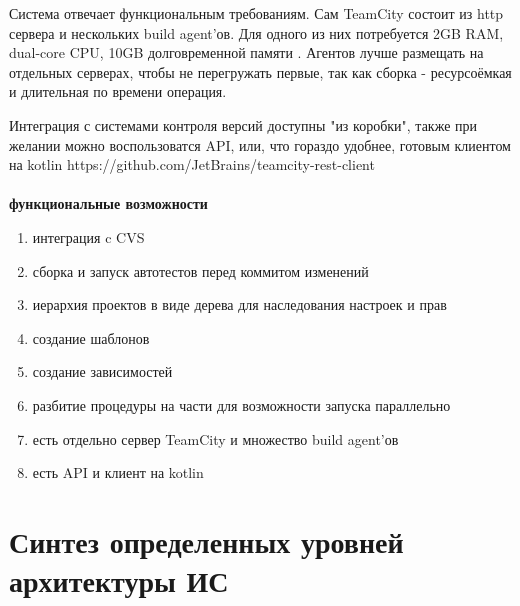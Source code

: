 \documentclass{article}
\begin{document}

Система отвечает функциональным требованиям.
Сам TeamCity состоит из http сервера и нескольких build agent'ов.
Для одного из них потребуется 2GB RAM, dual-core CPU, 10GB долговременной памяти \cite{octopus}.
Агентов лучше размещать на отдельных серверах, чтобы не перегружать первые, так как сборка - ресурсоёмкая и длительная по времени операция.

Интеграция с системами контроля версий доступны "из коробки", также при желании можно воспользоватся API, или, что гораздо удобнее,
готовым клиентом на kotlin https://github.com/JetBrains/teamcity-rest-client
\\\\
\textbf{функциональные возможности \cite{teamcity}}
\begin{enumerate}
    \item{интеграция c CVS}
    \item{сборка и запуск автотестов перед коммитом изменений}
    \item{иерархия проектов в виде дерева для наследования настроек и прав}
    \item{создание шаблонов}
    \item{создание зависимостей}
    \item{разбитие процедуры на части для возможности запуска  параллельно}
    \item{есть отдельно сервер TeamCity и множество build agent'ов}
    \item{есть API и клиент на kotlin}
\end{enumerate}
\pagebreak

\section{Синтез определенных уровней архитектуры ИС}
\end{document}
